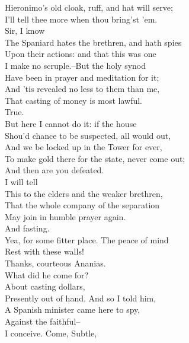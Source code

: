 \documentclass{memoir}
\begin{document}
\begin{drama*}
 Hieronimo's old cloak, ruff, and hat will serve;\\
 I'll tell thee more when thou bring'st 'em.\\
\ananiasspeaks {} Sir, I know\\
 The Spaniard hates the brethren, and hath spies\\
 Upon their actions: and that this was one\\
 I make no scruple.--But the holy synod\\
 Have been in prayer and meditation for it;\\
 And 'tis revealed no less to them than me,\\
 That casting of money is most lawful.\\
\subtlespeaks  True.\\
 But here I cannot do it: if the house\\
 Shou'd chance to be suspected, all would out,\\
 And we be locked up in the Tower for ever,\\
 To make gold there for the state, never come out;\\
 And then are you defeated.\\
\ananiasspeaks {} I will tell\\
 This to the elders and the weaker brethren,\\
 That the whole company of the separation\\
 May join in humble prayer again.\\
\subtlespeaks {} And fasting.\\
\ananiasspeaks  Yea, for some fitter place. The peace of mind\\
 Rest with these walls!\\
\subtlespeaks {} Thanks, courteous Ananias.\\
\facespeaks  What did he come for?\\
\subtlespeaks {} About casting dollars,\\
 Presently out of hand. And so I told him,\\
 A Spanish minister came here to spy,\\
 Against the faithful--\\
\facespeaks {} I conceive. Come, Subtle,\\

\end{drama*}
\end{document}
